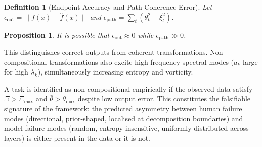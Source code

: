 \documentclass[12pt, a4paper]{article}
\newtheorem{definition}[theorem]{Definition}
\newtheorem{proposition}[theorem]{Proposition}
\theoremstyle{remark}
\theoremstyle{definition}
\begin{document}
\begin{definition}[Endpoint Accuracy and Path Coherence Error]
Let $\epsilon_{\mathrm{out}} = \|f(x) - \hat{f}(x)\|$ and
$\epsilon_{\mathrm{path}} = \sum_t (\theta_t^2 + \xi_t^2)$.
\end{definition}

\begin{proposition}
It is possible that $\epsilon_{\mathrm{out}} \approx 0$ while $\epsilon_{\mathrm{path}} \gg 0$.
\end{proposition}

This distinguishes correct outputs from coherent transformations.  Non-compositional
transformations also excite high-frequency spectral modes ($a_k$ large for high
$\lambda_k$), simultaneously increasing entropy and vorticity.

A task is identified as non-compositional empirically if the observed data satisfy
$\Xi > \Xi_{\max}$ and $\bar\theta > \theta_{\max}$ despite low output error.  This
constitutes the falsifiable signature of the framework: the predicted asymmetry between
human failure modes (directional, prior-shaped, localised at decomposition boundaries)
and model failure modes (random, entropy-insensitive, uniformly distributed across layers)
is either present in the data or it is not.
\end{document}
